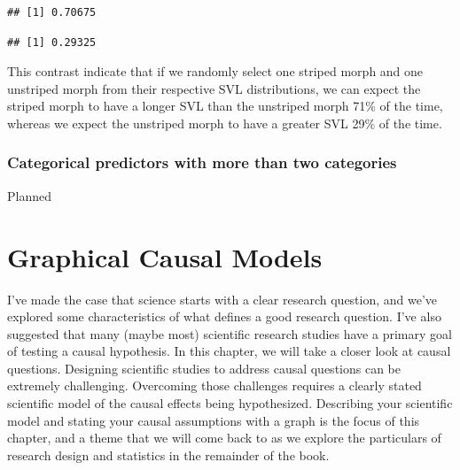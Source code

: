 \documentclass[
]{book}
\newenvironment{Shaded}{\begin{snugshade}}{\end{snugshade}}
\newcommand{\CommentTok}[1]{\textcolor[rgb]{0.56,0.35,0.01}{\textit{#1}}}
\newcommand{\DecValTok}[1]{\textcolor[rgb]{0.00,0.00,0.81}{#1}}
\newcommand{\FunctionTok}[1]{\textcolor[rgb]{0.13,0.29,0.53}{\textbf{#1}}}
\newcommand{\NormalTok}[1]{#1}
\newcommand{\SpecialCharTok}[1]{\textcolor[rgb]{0.81,0.36,0.00}{\textbf{#1}}}
\begin{document}
\begin{Shaded}
\end{Shaded}

\begin{verbatim}
## [1] 0.70675
\end{verbatim}

\begin{Shaded}
\end{Shaded}

\begin{verbatim}
## [1] 0.29325
\end{verbatim}

This contrast indicate that if we randomly select one striped morph and one unstriped morph from their respective SVL distributions, we can expect the striped morph to have a longer SVL than the unstriped morph 71\% of the time, whereas we expect the unstriped morph to have a greater SVL 29\% of the time.

\subsection{Categorical predictors with more than two categories}\label{categorical-predictors-with-more-than-two-categories}

Planned

\chapter{Graphical Causal Models}\label{graphical-causal-models}

I've made the case that science starts with a clear research question, and we've explored some characteristics of what defines a good research question. I've also suggested that many (maybe most) scientific research studies have a primary goal of testing a causal hypothesis. In this chapter, we will take a closer look at causal questions. Designing scientific studies to address causal questions can be extremely challenging. Overcoming those challenges requires a clearly stated scientific model of the causal effects being hypothesized. Describing your scientific model and stating your causal assumptions with a graph is the focus of this chapter, and a theme that we will come back to as we explore the particulars of research design and statistics in the remainder of the book.
\end{document}
